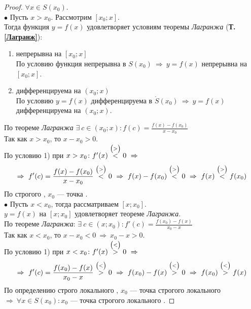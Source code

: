 \begin{proof}
	$\forall x \in S(x_0)$.\\
	$\bullet$ Пусть $x > x_0$. Рассмотрим $[x_0; x]$. \\
	Тогда функция $y=f(x)$ удовлетворяет условиям теоремы \textit{Лагранжа} (\textbf{Т.\ref{Лагранж}}):
	\begin{enumerate}
		\item непрерывна на $[x_0; x]$\\
		      По условию функция непрерывна в $S(x_0)\ \Rightarrow\ y=f(x)$ непрерывна на $[x_0; x]$.
		\item дифференцируема на $(x_0; x)$\\
		      По условию $y=f(x)$ дифференцируема в $\mathring{S}(x_0)\ \Rightarrow\ y=f(x)$ дифференцируема на $(x_0; x)$.
	\end{enumerate}
	По теореме \textit{Лагранжа} $\displaystyle \exists\ c \in (x_0; x)\colon f(c) = \frac{f(x) - f(x_0)}{x - x_0}$\\
	Так как $x > x_0$, то $x - x_0 > 0$.\\
	По условию 1) при $x > x_0\colon f'(x) \overset{\scriptsize{\big(>\big)}}{<} 0\ \Rightarrow$
	\begin{gather*}
		\Rightarrow\ f'(c) = \frac{f(x) - f(x_0)}{x - x_0} \overset{\scriptsize{\big(>\big)}}{<} 0\ \Rightarrow\ f(x) - f(x_0) \overset{\scriptsize{\big(>\big)}}{<} 0\ \Rightarrow\ f(x) \overset{\scriptsize{\big(>\big)}}{<} f(x_0)
	\end{gather*}
	По  строгого , $x_0$ --- точка .\\
	$\bullet$ Пусть $x<x_0$, тогда рассматриваем $[x; x_0]$.\\
	$y=f(x)$ на $[x; x_0]$ удовлетворяет теореме \textit{Лагранжа}.\\[1ex]
	По теореме \textit{Лагранжа}: $\displaystyle \exists\ c \in (x; x_0)\colon f'(c) = \frac{f(x_0) - f(x)}{x_0 - x}$\\[1ex]
	Так как $x < x_0$, то $x - x_0 < 0\ \Rightarrow\ x_0-x > 0$.\\
	По условию 1) при $x < x_0\colon f'(x) \overset{\scriptsize{\big(<\big)}}{>} 0\ \Rightarrow$
	\begin{gather*}
		\Rightarrow\ f'(c) = \frac{f(x_0) - f(x)}{x_0 - x} \overset{\scriptsize{\big(<\big)}}{>} 0\ \Rightarrow\ f(x_0) - f(x) \overset{\scriptsize{\big(<\big)}}{>} 0\ \Rightarrow\ f(x_0) \overset{\scriptsize{\big(<\big)}}{>} f(x)
	\end{gather*}
	По определению строго локального , $x_0$ --- точка строгого локального\\[1ex]
	 $\Rightarrow\ \forall x \in S(x_0)\colon x_0$ --- точка строгого локального .
\end{proof} \vspace{-11pt}
